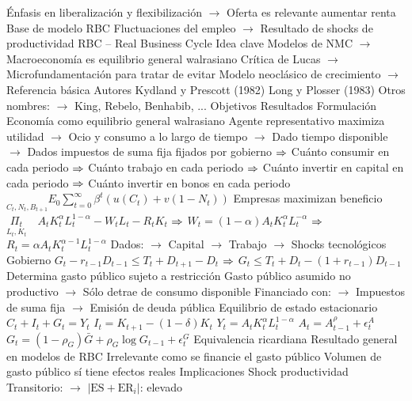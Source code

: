 \documentclass{nuevotema}
\begin{document}
\begin{esquemal}
				\4[] Énfasis en liberalización y flexibilización
				\4[] $\to$ Oferta es relevante aumentar renta
				\4 Base de modelo RBC
				\4[] Fluctuaciones del empleo
				\4[] $\to$ Resultado de shocks de productividad
		\2 RBC -- Real Business Cycle
			\3 Idea clave
				\4 Modelos de NMC
				\4[] $\to$ Macroeconomía es equilibrio general walrasiano
				\4[] Crítica de Lucas
				\4[] $\to$ Microfundamentación para tratar de evitar
				\4[] Modelo neoclásico de crecimiento
				\4[] $\to$ Referencia básica
				\4 Autores
				\4[] Kydland y Prescott (1982)
				\4[] Long y Plosser (1983)
				\4[] Otros nombres:
				\4[] $\to$  King, Rebelo, Benhabib, ...
				\4 Objetivos
				\4 Resultados
			\3 Formulación
				\4 Economía como equilibrio general walrasiano
				\4 Agente representativo maximiza utilidad
				\4[] $\to$ Ocio y consumo a lo largo de tiempo
				\4[] $\to$ Dado tiempo disponible
				\4[] $\to$ Dados impuestos de suma fija fijados por gobierno
				\4[] $\Rightarrow$ Cuánto consumir en cada periodo
				\4[] $\Rightarrow$ Cuánto trabajo en cada periodo
				\4[] $\Rightarrow$ Cuánto invertir en capital en cada periodo
				\4[] $\Rightarrow$ Cuánto invertir en bonos en cada periodo
				\4[] $\underset{C_t, N_t, B_{t+1}} \quad E_0 \sum_{t=0}^\infty \beta^t \left( u(C_t)+v(1-N_t) \right)$
				\4 Empresas maximizan beneficio
				\4[] $\underset{L_t, K_t}{\Pi_t} \quad A_t K_t^\alpha L_t^{1-\alpha} - W_t L_t - R_t K_t$
				\4[] $\Rightarrow$ $W_t = (1-\alpha) A_t K_t^\alpha L_t^{-\alpha}$
				\4[] $\Rightarrow$ $R_t = \alpha A_t K_t^{\alpha -1} L_t^{1-\alpha}$
				\4[] Dados:
				\4[] $\to$ Capital
				\4[] $\to$ Trabajo
				\4[] $\to$ Shocks tecnológicos
				\4 Gobierno
				\4[] $G_t - r_{t-1} D_{t-1} \leq T_t + D_{t+1} - D_t$
				\4[] $\Rightarrow$ $G_t \leq T_t + D_t - (1+r_{t-1}) D_{t-1}$
				\4[] Determina gasto público sujeto a restricción
				\4[] Gasto público asumido no productivo
				\4[] $\to$ Sólo detrae de consumo disponible
				\4[] Financiado con:
				\4[] $\to$ Impuestos de suma fija
				\4[] $\to$ Emisión de deuda pública
				\4 Equilibrio de estado estacionario
				\4[] $C_t + I_t + G_t = Y_t$
				\4[] $I_t = K_{t+1} - (1-\delta) K_t$
				\4[] $Y_t = A_t K_t^\alpha L_t^{1-\alpha}$
				\4[] $A_t = A_{t-1}^\rho + \epsilon_t^A$
				\4[] $G_t= (1-\rho_G) \bar{G} + \rho_G \log G_{t-1} + \epsilon_t^G$
				\4 Equivalencia ricardiana
				\4[] Resultado general en modelos de RBC
				\4[] Irrelevante como se financie el gasto público
				\4[] Volumen de gasto público sí tiene efectos reales
			\3 Implicaciones
				\4 Shock productividad
				\4[] Transitorio:
				\4[] $\to$ $\left| \text{ES} + \text{ER}_i\right|$: elevado

\end{esquemal}
\end{document}
